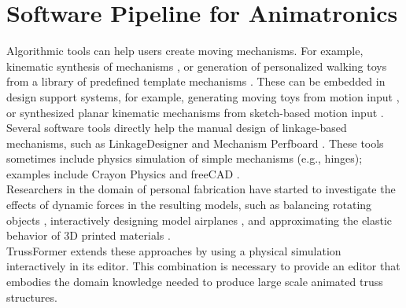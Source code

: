 \section{Software Pipeline for Animatronics}
Algorithmic tools can help users create moving mechanisms. For example, kinematic synthesis of mechanisms \cite{subramanian:1995}, or generation of personalized walking toys from a library of predefined template mechanisms \cite{bharaj:2015}. These can be embedded in design support systems, for example, generating moving toys from motion input \cite{zhu:2012}, or synthesized planar kinematic mechanisms from sketch-based motion input \cite{coros:2013}.\\
Several software tools directly help the manual design of linkage-based mechanisms, such as LinkageDesigner \cite{linkage} and Mechanism Perfboard \cite{jeong:2018}. These tools sometimes include physics simulation of simple mechanisms (e.g., hinges); examples include Crayon Physics \cite{crayon} and freeCAD \cite{freeCAD}.\\
Researchers in the domain of personal fabrication have started to investigate the effects of dynamic forces in the resulting models, such as balancing rotating objects \cite{prevost:2013}, interactively designing model airplanes \cite{umetani:2014}, and approximating the elastic behavior of 3D printed materials \cite{chen:2017}.\\
TrussFormer extends these approaches by using a physical simulation interactively in its editor. This combination is necessary to provide an editor that embodies the domain knowledge needed to produce large scale animated truss structures.

